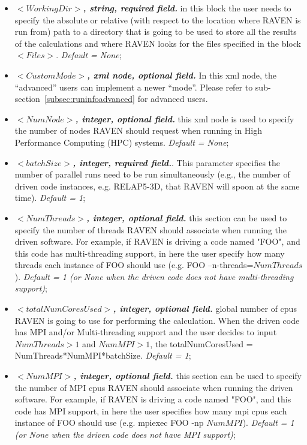 \begin{itemize}
\item $<WorkingDir>$\textbf{\textit{, string, required field.}} in this block the user needs to specify the absolute or relative (with respect to the location where RAVEN is run from) path to a directory that is going to be used to store all the results of the calculations and where RAVEN looks for the files specified in the block $<Files>$. \textit{Default = None};



\item $<CustomMode>$\textbf{\textit{, xml node, optional field.}} In this xml node, the ``advanced'' users can implement a newer ``mode''. Please refer to sub-section~\ref{subsec:runinfoadvanced} for advanced users.



\item $<NumNode>$\textbf{\textit{, integer, optional field.}}  this xml node is used to specify the number of nodes RAVEN should request when running in High Performance Computing (HPC) systems. \textit{Default = None};

\item $<batchSize>$\textbf{\textit{, integer, required field.}}. This parameter specifies the number of parallel runs need to be run simultaneously (e.g., the number of driven code instances, e.g. RELAP5-3D, that RAVEN will spoon at the same time). \textit{Default = 1};

\item $<NumThreads>$\textbf{\textit{, integer, optional field.}} this section can be used to specify the number of threads RAVEN should associate when running the driven software. For example, if RAVEN is driving a code named "FOO", and this code has multi-threading support, in here the user specify how many threads each instance of FOO should use (e.g. FOO --n-threads=$NumThreads$). \textit{Default = 1 (or None when the driven code does not have multi-threading support)};

\item $<totalNumCoresUsed>$\textbf{\textit{, integer, optional field.}}  global number of cpus RAVEN is going to use for performing the calculation. When the driven code has MPI and/or  Multi-threading support and the user decides to input $NumThreads > 1$  and $NumMPI > 1$, the totalNumCoresUsed = NumThreads*NumMPI*batchSize. \textit{Default = 1};

\item $<NumMPI>$\textbf{\textit{, integer, optional field.}}  this section can be used to specify the number of MPI cpus RAVEN should associate when running the driven software. For example, if RAVEN is driving a code named "FOO", and this code has MPI support, in here the user specifies how many mpi cpus each instance of FOO should use (e.g. mpiexec FOO -np $NumMPI$). \textit{Default = 1 (or None when the driven code does not have MPI support)};


\end{itemize}
